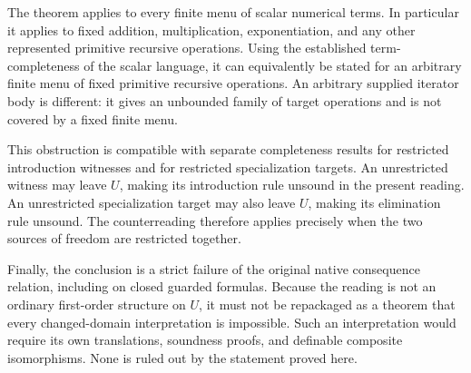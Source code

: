 The theorem applies to every finite menu of scalar numerical terms.  In
particular it applies to fixed addition, multiplication, exponentiation,
and any other represented primitive recursive operations.  Using the
established term-completeness of the scalar language, it can equivalently
be stated for an arbitrary finite menu of fixed primitive recursive
operations.  An arbitrary supplied iterator body is different: it gives
an unbounded family of target operations and is not covered by a fixed
finite menu.

This obstruction is compatible with separate completeness results for
restricted introduction witnesses and for restricted specialization
targets.  An unrestricted witness may leave $U$, making its introduction
rule unsound in the present reading.  An unrestricted specialization
target may also leave $U$, making its elimination rule unsound.  The
counterreading therefore applies precisely when the two sources of
freedom are restricted together.

Finally, the conclusion is a strict failure of the original native
consequence relation, including on closed guarded formulas.  Because the
reading is not an ordinary first-order structure on $U$, it must not be
repackaged as a theorem that every changed-domain interpretation is
impossible.  Such an interpretation would require its own translations,
soundness proofs, and definable composite isomorphisms.  None is ruled out
by the statement proved here.

